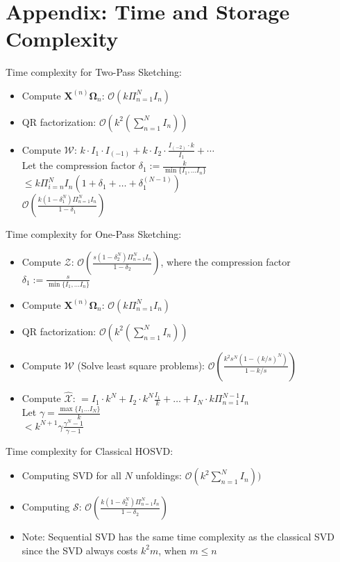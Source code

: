 \section{Appendix: Time and Storage Complexity} \label{appendix: time-complexity}

Time complexity for Two-Pass Sketching: \\ 
\begin{itemize}
    \item Compute $\mathbf{X}^{(n)} \mathbf{\Omega}_n$: $\mathcal{O}(k \Pi_{n=1}^N I_n)$ 
    \item QR factorization: $\mathcal{O}(k^2(\sum_{n =1}^N I_n )) $  
    \item Compute $\mathscr{W}$: $k\cdot I_1 \cdot I_{(-1)} + k \cdot I_2 \cdot \frac{I_{(-2)}\cdot k}{I_1} + \cdots$ \\   
    Let the compression factor $\delta_1:= \frac{k}{\min\{I_1, \dots I_n\}}$ \\ 
    $\leq k\Pi_{i=n}^N I_n (1 + \delta_1+ \dots + \delta_1^{(N-1)})$ \\ 
    $\mathcal{O}(\frac{k(1-\delta_1^N)\Pi_{n = 1}^N I_n}{1-\delta_1}) $
\end{itemize}

Time complexity for One-Pass Sketching: \\ 
\begin{itemize}
    \item Compute $\mathscr{Z}$: $ \mathcal{O}(\frac{s(1-\delta_2^N)\Pi_{n = 1}^N I_n}{1-\delta_2})$, where the compression factor $\delta_1:= \frac{s}{\min\{I_1, \dots I_n\}}$
    \item Compute $\mathbf{X}^{(n)} \mathbf{\Omega}_n$: $\mathcal{O}(k \Pi_{n=1}^N I_n)$ 
    \item QR factorization: $\mathcal{O}(k^2(\sum_{n =1}^N I_n )) $  
    \item Compute $\mathscr{W}$ (Solve least square problems): $\mathcal{O}(\frac{k^2s^N(1-(k/s)^N)}{1-k/s})$
    \item Compute $\hat{\mathscr{X}}$:
    $= I_1\cdot k^N + I_2 \cdot k^N \frac{I_1}{k} + \dots + I_N\cdot k \Pi_{n = 1}^{N-1} I_n$ \\ 
    Let $\gamma = \frac{\max \{I_1 \dots I_N\}}{k}$ \\ 
    $<  k^{N+1}\gamma \frac{\gamma^N -1}{\gamma - 1}$
\end{itemize}

Time complexity for Classical HOSVD: \\
\begin{itemize}
    \item Computing SVD for all $N$ unfoldings: $\mathscr{O}(k^2\sum_{n =1}^NI_n))$ 
    \item Computing $\mathscr{S}$: 
    $\mathcal{O}(\frac{k(1-\delta_2^N)\Pi_{n = 1}^N I_n}{1-\delta_2})$ 
    \item Note: Sequential SVD has the same time complexity as the classical SVD since the SVD always costs $k^2m$, when $m\leq n$
\end{itemize}

